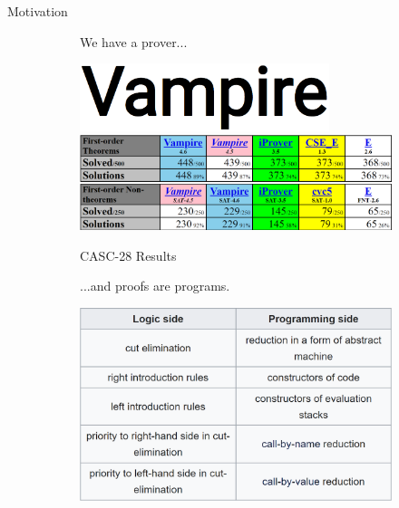 \documentclass{cubeamer}
\begin{document}
	\begin{frame}{Motivation}		
			\begin{figure}[!tbp]
				\begin{subfigure}[t]{0.48\textwidth}
					\noindent We have a prover...
					
					\begin{center}
						\includegraphics[width=0.8\textwidth]{Vampire.png}
						\includegraphics[width=\textwidth]{CASC.png}
						\caption{CASC-28 Results}
					\end{center}
					\vfill
				\end{subfigure}
				\begin{subfigure}[t]{0.48\textwidth}
					\hfill...and proofs are programs.
					\begin{center}
						\includegraphics[width=\textwidth]{proofs_as_programs.png}
					\end{center}
					\vfill
				\end{subfigure}
			\end{figure}
	\end{frame}
	
\end{document}
